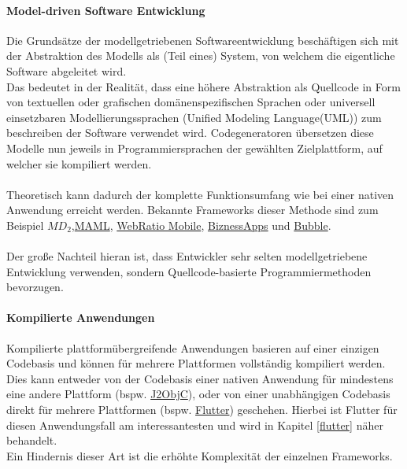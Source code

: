 \paragraph{Model-driven Software Entwicklung}
Die Grundsätze der modellgetriebenen Softwareentwicklung beschäftigen sich mit der Abstraktion des Modells als (Teil eines) System, von welchem die eigentliche Software abgeleitet wird. \cite{stahl2006}\\
Das bedeutet in der Realität, dass eine höhere Abstraktion als Quellcode in Form von textuellen oder grafischen domänenspezifischen Sprachen oder universell einsetzbaren Modellierungssprachen (Unified Modeling Language(UML)) zum beschreiben der Software verwendet wird. 
Codegeneratoren übersetzen diese Modelle nun jeweils in Programmiersprachen der gewählten Zielplattform, auf welcher sie kompiliert werden.\\
\\
Theoretisch kann dadurch der komplette Funktionsumfang wie bei einer nativen Anwendung erreicht werden.
Bekannte Frameworks dieser Methode sind zum Beispiel \href{https://www.wi.uni-muenster.de/sites/wi/files/public/department/pi/publications/heitkoetter/cross-platform-model-driven-development-of-mobile-applications-with-md2.pdf}{$M\!D_2$},\href{https://www.sciencedirect.com/science/article/abs/pii/S1477842417301215}{MAML}, \href{https://www.webratio.com/site/content/en/home}{WebRatio Mobile}, \href{https://www.biznessapps.com/}{BiznessApps} und \href{https://bubble.io/}{Bubble}.\\
\\
Der große Nachteil hieran ist, dass Entwickler sehr selten modellgetriebene Entwicklung verwenden, sondern Quellcode-basierte Programmiermethoden bevorzugen. \cite{bjorn-hansen2020}
\paragraph{Kompilierte Anwendungen}
\label{compilierte_anwendungen}
Kompilierte plattformübergreifende Anwendungen basieren auf einer einzigen Codebasis und können für mehrere Plattformen vollständig kompiliert werden. 
Dies kann entweder von der Codebasis einer nativen Anwendung für mindestens eine andere Plattform (bspw. \href{https://developers.google.com/j2objc/}{J2ObjC}), oder von einer unabhängigen Codebasis direkt für mehrere Plattformen (bspw. \href{https://flutter.dev/}{Flutter}) geschehen.
Hierbei ist Flutter für diesen Anwendungsfall am interessantesten und wird in Kapitel \ref{flutter} näher behandelt.\\
Ein Hindernis dieser Art ist die erhöhte Komplexität der einzelnen Frameworks.

